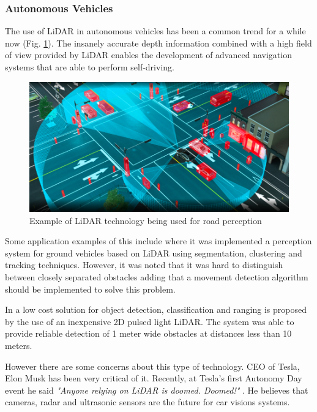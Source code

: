 \subsubsection*{Autonomous Vehicles}

The use of \ac{LiDAR} in autonomous vehicles has been a common trend for a while now (Fig. \ref{fig:lidarcar}). The insanely accurate depth information combined with a high field of view provided by \ac{LiDAR} enables the development of advanced navigation systems that are able to perform self-driving.
 
 
\begin{figure}[h] 
\centerline{\includegraphics [width=0.7 \textwidth]{imgs/chapter2/lidarcar.png}}
\caption{Example of \ac{LiDAR} technology being used for road perception \cite{lidarcar}}
\label{fig:lidarcar}
\end{figure}

Some application examples of this include \cite{lidarperception}  where it was implemented a perception system for ground vehicles based on \ac{LiDAR} using segmentation, clustering and tracking techniques.  However, it was noted that it was hard to distinguish between closely  separated obstacles adding that a movement detection algorithm should be implemented to solve this problem. 

In \cite{car2dlidar} a low cost solution for object detection, classification and ranging is  proposed by the use of an inexpensive 2D pulsed light \ac{LiDAR}. The system was able to provide reliable detection of 1 meter wide obstacles at distances less than 10 meters.


However there are some concerns about this type of technology. CEO of Tesla, Elon Musk has been very critical of it. Recently, at Tesla’s first Autonomy Day event  he said \textit{"Anyone relying on \ac{LiDAR} is doomed. Doomed!"} \cite{elon}. He believes that cameras, radar and ultrasonic sensors are the future for car visions systems. 
